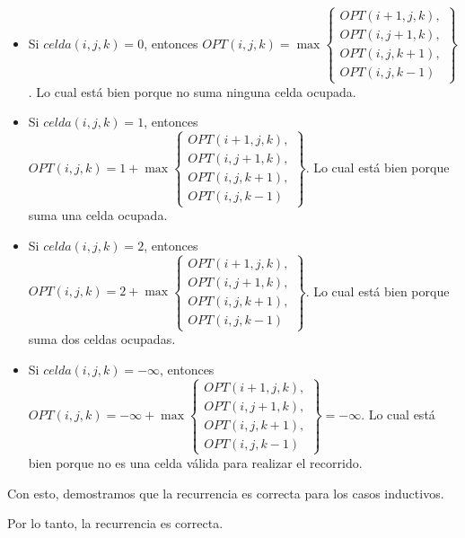 \begin{itemize}
    \item Si $celda(i, j, k) = 0$, entonces $OPT(i, j, k) = \max\left\{
        \begin{array}{l}
            OPT(i+1, j, k), \\
            OPT(i, j+1, k), \\
            OPT(i, j, k+1), \\
            OPT(i, j, k-1)
        \end{array}
    \right\}$. Lo cual está bien porque no suma ninguna celda ocupada.
    
    \item Si $celda(i, j, k) = 1$, entonces $OPT(i, j, k) = 1 + \max\left\{
        \begin{array}{l}
            OPT(i+1, j, k), \\
            OPT(i, j+1, k), \\
            OPT(i, j, k+1), \\
            OPT(i, j, k-1)
        \end{array}
    \right\}$. Lo cual está bien porque suma una celda ocupada.
    
    \item Si $celda(i, j, k) = 2$, entonces $OPT(i, j, k) = 2 + \max\left\{
        \begin{array}{l}
            OPT(i+1, j, k), \\
            OPT(i, j+1, k), \\
            OPT(i, j, k+1), \\
            OPT(i, j, k-1)
        \end{array}
    \right\}$. Lo cual está bien porque suma dos celdas ocupadas.
    
    \item Si $celda(i, j, k) = -\infty$, entonces $OPT(i, j, k) = -\infty + \max\left\{
        \begin{array}{l}
            OPT(i+1, j, k), \\
            OPT(i, j+1, k), \\
            OPT(i, j, k+1), \\
            OPT(i, j, k-1)
        \end{array}
    \right\} = -\infty$. Lo cual está bien porque no es una celda válida para realizar el recorrido.
\end{itemize}


Con esto, demostramos que la recurrencia es correcta para los casos inductivos.

Por lo tanto, la recurrencia es correcta.



